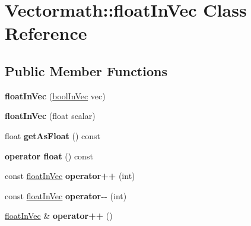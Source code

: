 \hypertarget{classVectormath_1_1floatInVec}{}\section{Vectormath\+:\+:float\+In\+Vec Class Reference}
\label{classVectormath_1_1floatInVec}
\subsection*{Public Member Functions}
\begin{DoxyCompactItemize}
\item 
\mbox{\label{classVectormath_1_1floatInVec_afaa5f27e47ae2f7c1eabfc721b2619bb}} 
{\bfseries float\+In\+Vec} (\hyperlink{classVectormath_1_1boolInVec}{bool\+In\+Vec} vec)
\item 
\mbox{\label{classVectormath_1_1floatInVec_a0d9fe72973e2d8393e29bc5891fc0549}} 
{\bfseries float\+In\+Vec} (float scalar)
\item 
\mbox{\label{classVectormath_1_1floatInVec_afc897ca00b14d77a0cd651c344a20b49}} 
float {\bfseries get\+As\+Float} () const
\item 
\mbox{\label{classVectormath_1_1floatInVec_a95fab4d4950925b69c7c225bad542c67}} 
{\bfseries operator float} () const
\item 
\mbox{\label{classVectormath_1_1floatInVec_adf90abe101b93990227e5e7ea879bdb7}} 
const \hyperlink{classVectormath_1_1floatInVec}{float\+In\+Vec} {\bfseries operator++} (int)
\item 
\mbox{\label{classVectormath_1_1floatInVec_a73b9b6bb31e6e833de65a797e3d45dba}} 
const \hyperlink{classVectormath_1_1floatInVec}{float\+In\+Vec} {\bfseries operator-\/-\/} (int)
\item 
\mbox{\label{classVectormath_1_1floatInVec_a8809092da8cc4515717703ce9a405621}} 
\hyperlink{classVectormath_1_1floatInVec}{float\+In\+Vec} \& {\bfseries operator++} ()
\item 
\mbox{\label{classVectormath_1_1floatInVec_a20fdc0646e155d22f5783274a9f97791}} 

\end{DoxyCompactItemize}
